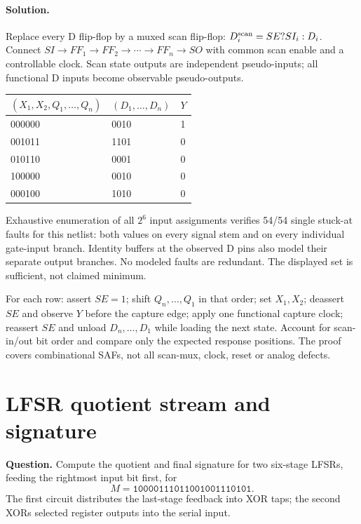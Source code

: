 \documentclass[11pt]{article}
\newcommand{\sol}{\paragraph{Solution.}}
\begin{document}
\sol Replace every D flip-flop by a muxed scan flip-flop:
$D_i^{\rm scan}=SE?SI_i:D_i$.
Connect $SI\to FF_1\to FF_2\to\cdots\to FF_n\to SO$ with common scan enable
and a controllable clock. Scan state outputs are independent pseudo-inputs;
all functional D inputs become observable pseudo-outputs.
\begin{center}\begin{tabular}{lll}\toprule $(X_1,X_2,Q_1,\ldots,Q_n)$ & $(D_1,\ldots,D_n)$ & $Y$\\\midrule
000000 & 0010 & 1\\
001011 & 1101 & 0\\
010110 & 0001 & 0\\
100000 & 0010 & 0\\
000100 & 1010 & 0\\
\bottomrule\end{tabular}\end{center}
Exhaustive enumeration of all $2^{6}$ input assignments verifies
54/54 single stuck-at faults for this netlist:
both values on every signal stem and on every individual gate-input branch.
Identity buffers at the observed D pins also model their separate output branches.
No modeled faults are redundant. The displayed set is sufficient, not claimed minimum.

For each row: assert $SE=1$; shift $Q_n,\ldots,Q_1$ in that order;
set $X_1,X_2$; deassert $SE$ and observe $Y$ before the capture edge;
apply one functional capture clock; reassert $SE$ and unload
$D_n,\ldots,D_1$ while loading the next state.
Account for scan-in/out bit order and compare only the expected response positions.
The proof covers combinational SAFs, not all scan-mux, clock, reset or analog defects.

\section{LFSR quotient stream and signature}
\textbf{Question.} Compute the quotient and final signature for two six-stage
LFSRs, feeding the rightmost input bit first, for
\[
M=\texttt{10000111011001001110101}.
\]
The first circuit distributes the last-stage feedback into XOR taps;
the second XORs selected register outputs into the serial input.
\begin{center}\end{center}
\end{document}
